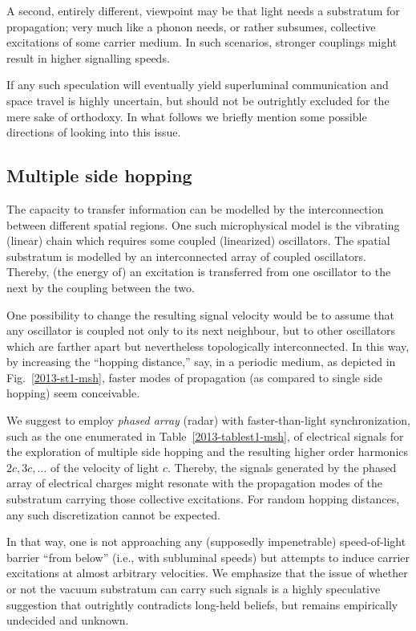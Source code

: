 \documentclass[%
  preprint,
 showpacs,
 showkeys,
 preprintnumbers,
 amsmath,amssymb,
 aps,
  pra,
  longbibliography,
 ]{revtex4-1}
\begin{document}
A second, entirely different, viewpoint may be that light needs a substratum for propagation;
very much like a phonon needs, or rather subsumes,
collective excitations of some carrier medium.
In such scenarios, stronger couplings might result in higher signalling speeds.

If any such speculation will eventually yield superluminal communication and space travel is highly uncertain,
but should not be outrightly excluded for the mere sake of orthodoxy.
In what follows we briefly mention some possible directions of looking into this issue.

\subsection{Multiple side hopping}

The capacity to transfer information can be modelled by the interconnection between different spatial regions.
One such microphysical model is the vibrating (linear) chain \cite[Sec.~1.2]{Henley-Thirring-EQFT}
which requires some coupled (linearized) oscillators.
The spatial substratum  is modelled by an interconnected array of coupled oscillators.
Thereby, (the energy of) an excitation is transferred from one oscillator to the next by the coupling between the two.

One possibility to change the resulting signal velocity would be to assume that any oscillator is coupled not only to its next neighbour,
but to other oscillators which are farther apart but nevertheless topologically interconnected. In this way, by increasing the ``hopping distance,''
say, in a periodic medium, as depicted in Fig.~\ref{2013-st1-msh},
faster modes of propagation (as compared to single side hopping) seem conceivable.

We suggest to employ {\em  phased array} (radar) with faster-than-light synchronization, such as the
one enumerated in Table~\ref{2013-tablest1-msh}, of electrical signals
for the exploration of multiple side hopping and the resulting higher order harmonics $2c, 3c,\ldots $ of the velocity of light $c$.
Thereby, the signals generated by the phased array of electrical charges
might resonate with the propagation modes of the substratum carrying those collective excitations.
For random hopping distances, any such discretization cannot be expected.

In that way, one is not approaching any (supposedly impenetrable) speed-of-light barrier ``from below'' (i.e., with subluminal speeds) but
attempts to induce carrier excitations at almost arbitrary velocities.
We emphasize that the issue of whether or not the vacuum substratum can carry such signals is a highly speculative suggestion
that outrightly contradicts long-held beliefs, but remains empirically undecided and unknown.
\end{document}
